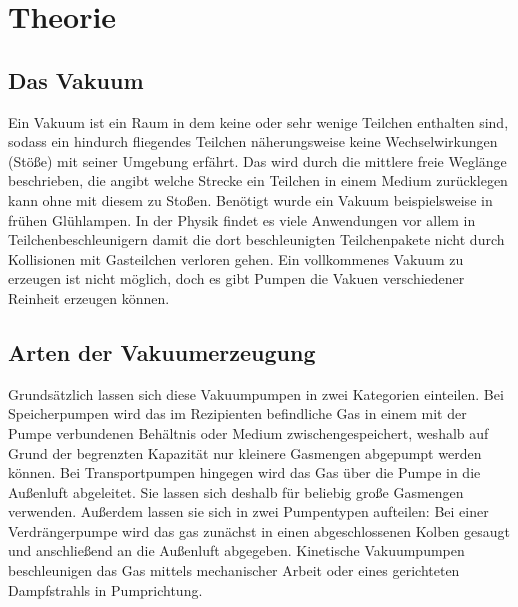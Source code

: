
\section{Theorie}
\label{sec:Theorie}

\subsection{Das Vakuum}
Ein Vakuum ist ein Raum in dem keine oder sehr wenige Teilchen enthalten sind, sodass ein hindurch fliegendes Teilchen näherungsweise keine Wechselwirkungen (Stöße) mit seiner Umgebung erfährt. Das wird durch die mittlere freie Weglänge beschrieben, die angibt welche Strecke ein Teilchen in einem Medium zurücklegen kann ohne mit diesem zu Stoßen. Benötigt wurde ein Vakuum beispielsweise in frühen Glühlampen. In der Physik findet es viele Anwendungen vor allem in Teilchenbeschleunigern damit die dort beschleunigten Teilchenpakete nicht durch Kollisionen mit Gasteilchen verloren gehen.
Ein vollkommenes Vakuum zu erzeugen ist nicht möglich, doch es gibt Pumpen die Vakuen verschiedener Reinheit erzeugen können.
\subsection{Arten der Vakuumerzeugung}
Grundsätzlich lassen sich diese Vakuumpumpen in zwei Kategorien einteilen.
Bei Speicherpumpen wird das im Rezipienten befindliche Gas in einem mit der Pumpe verbundenen Behältnis oder Medium zwischengespeichert, weshalb auf Grund der begrenzten Kapazität nur kleinere Gasmengen abgepumpt werden können.
Bei Transportpumpen hingegen wird das Gas über die Pumpe in die Außenluft abgeleitet. Sie lassen sich deshalb für beliebig große Gasmengen verwenden.\cite{Jena} 
Außerdem lassen sie sich in zwei Pumpentypen aufteilen:\newline
Bei einer Verdrängerpumpe wird das gas zunächst in einen abgeschlossenen Kolben gesaugt und anschließend an die Außenluft abgegeben.\newline
Kinetische Vakuumpumpen beschleunigen das Gas mittels mechanischer Arbeit oder eines gerichteten Dampfstrahls in Pumprichtung\cite{Pfeiffer}.
